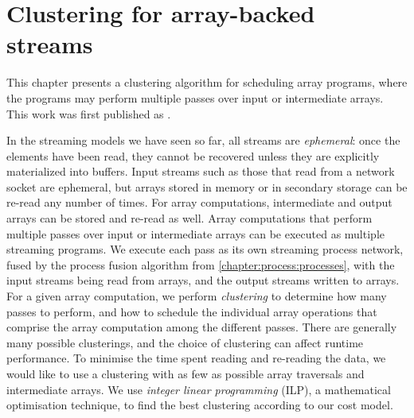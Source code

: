 \chapter{Clustering for array-backed streams}
\label{clustering}



This chapter presents a clustering algorithm for scheduling array programs, where the programs may perform multiple passes over input or intermediate arrays.
This work was first published as \citet{robinson2014fusing}.

In the streaming models we have seen so far, all streams are \emph{ephemeral}: once the elements have been read, they cannot be recovered unless they are explicitly materialized into buffers.
Input streams such as those that read from a network socket are ephemeral, but arrays stored in memory or in secondary storage can be re-read any number of times.
For array computations, intermediate and output arrays can be stored and re-read as well.
Array computations that perform multiple passes over input or intermediate arrays can be executed as multiple streaming programs.
We execute each pass as its own streaming process network, fused by the process fusion algorithm from \cref{chapter:process:processes}, with the input streams being read from arrays, and the output streams written to arrays.
For a given array computation, we perform \emph{clustering} to determine how many passes to perform, and how to schedule the individual array operations that comprise the array computation among the different passes.
There are generally many possible clusterings, and the choice of clustering can affect runtime performance.
To minimise the time spent reading and re-reading the data, we would like to use a clustering with as few as possible array traversals and intermediate arrays.
We use \emph{integer linear programming} (ILP), a mathematical optimisation technique, to find the best clustering according to our cost model.

